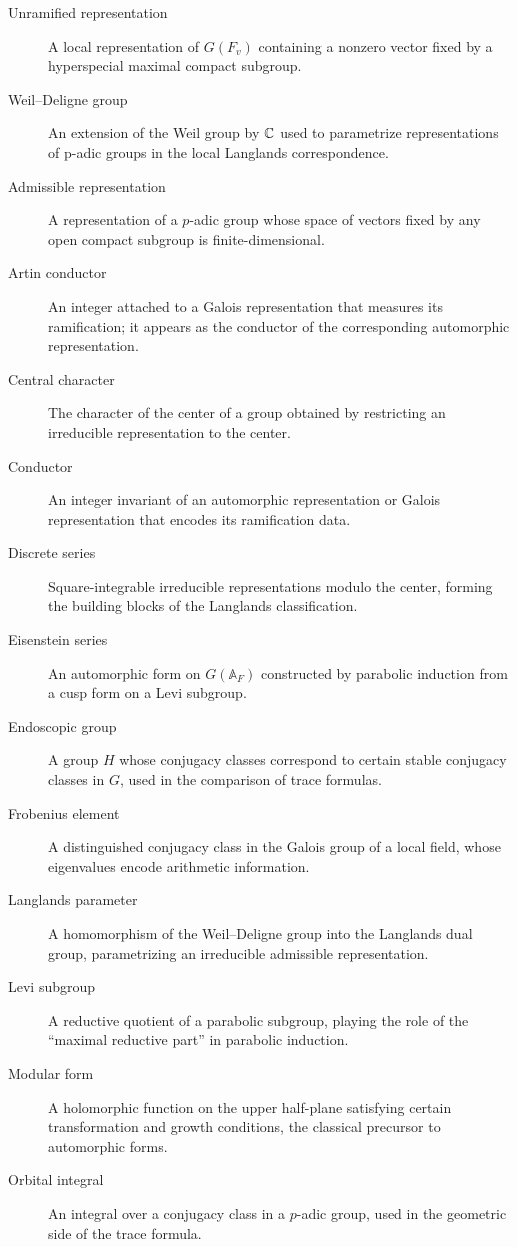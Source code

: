\begin{description}
\item[Unramified representation] A local representation of \(G(F_v)\) containing a nonzero vector fixed by a hyperspecial maximal compact subgroup.
\item[Weil--Deligne group] An extension of the Weil group by \(\mathbb{C}\) used to parametrize representations of p-adic groups in the local Langlands correspondence.
\item[Admissible representation] A representation of a \(p\)-adic group whose space of vectors fixed by any open compact subgroup is finite-dimensional.
\item[Artin conductor] An integer attached to a Galois representation that measures its ramification; it appears as the conductor of the corresponding automorphic representation.
\item[Central character] The character of the center of a group obtained by restricting an irreducible representation to the center.
\item[Conductor] An integer invariant of an automorphic representation or Galois representation that encodes its ramification data.
\item[Discrete series] Square-integrable irreducible representations modulo the center, forming the building blocks of the Langlands classification.
\item[Eisenstein series] An automorphic form on \(G(\mathbb{A}_F)\) constructed by parabolic induction from a cusp form on a Levi subgroup.
\item[Endoscopic group] A group \(H\) whose conjugacy classes correspond to certain stable conjugacy classes in \(G\), used in the comparison of trace formulas.
\item[Frobenius element] A distinguished conjugacy class in the Galois group of a local field, whose eigenvalues encode arithmetic information.
\item[Langlands parameter] A homomorphism of the Weil--Deligne group into the Langlands dual group, parametrizing an irreducible admissible representation.
\item[Levi subgroup] A reductive quotient of a parabolic subgroup, playing the role of the ``maximal reductive part'' in parabolic induction.
\item[Modular form] A holomorphic function on the upper half-plane satisfying certain transformation and growth conditions, the classical precursor to automorphic forms.
\item[Orbital integral] An integral over a conjugacy class in a \(p\)-adic group, used in the geometric side of the trace formula.

\end{description}
